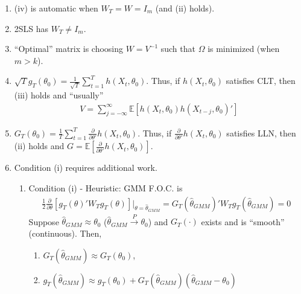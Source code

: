 \documentclass[11pt]{elegantbook}
\begin{document}
\begin{remark}
    \begin{enumerate}
        \item (iv) is automatic when $W_T=W=I_m$ (and (ii) holds).
        \item 2SLS has $W_T\neq I_m$.
        \item ``Optimal'' matrix is choosing $W=V^{-1}$ such that $\Omega$ is minimized (when $m>k$).
        \item $\sqrt{T}g_T(\theta_0)=\frac{1}{\sqrt{T}}\sum_{t=1}^Th(X_t,\theta_0)$. Thus, if $h(X_t,\theta_0)$ satisfies CLT, then (iii) holds and ``usually''
        \begin{equation}
            \begin{aligned}
                V=\sum_{j=-\infty}^{\infty}\mathbb{E}\left[h(X_t,\theta_0)h(X_{t-j},\theta_0)'\right]
            \end{aligned}
            \nonumber
        \end{equation}
        \item $G_T(\theta_0)=\frac{1}{T}\sum_{t=1}^T \frac{\partial }{\partial \theta'}h(X_t,\theta_0)$. Thus, if $\frac{\partial }{\partial \theta'}h(X_t,\theta_0)$ satisfies LLN, then (ii) holds and $G=\mathbb{E}[\frac{\partial }{\partial \theta'}h(X_t,\theta_0)]$.
        \item Condition (i) requires additional work.
        \begin{enumerate}
            \item Condition (i) - Heuristic: GMM F.O.C. is
            \begin{equation}
                \begin{aligned}
                    \frac{1}{2}\frac{\partial }{\partial \theta}\left[g_T(\theta)'W_Tg_T(\theta)\right]\bigg|_{\theta=\hat{\theta}_{GMM}}=G_T(\hat{\theta}_{GMM})'W_Tg_T(\hat{\theta}_{GMM})=0
                \end{aligned}
                \nonumber
            \end{equation}
            Suppose $\hat{\theta}_{GMM}\approx \theta_0$ ($\hat{\theta}_{GMM}\stackrel{P}{\longrightarrow} \theta_0$) and $G_T(\cdot)$ exists and is ``smooth'' (continuous). Then,
            \begin{enumerate}
                \item $G_T(\hat{\theta}_{GMM})\approx G_T(\theta_0)$,
                \item $g_T(\hat{\theta}_{GMM})\approx g_T(\theta_0)+G_T(\hat{\theta}_{GMM})\left(\hat{\theta}_{GMM}-\theta_0\right)$

\end{enumerate}
\end{enumerate}
\end{enumerate}
\end{remark}
\end{document}
